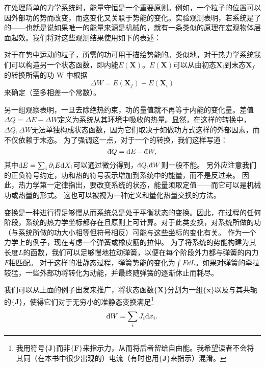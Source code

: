 	在处理简单的力学系统时，能量守恒是一个重要原则。例如，一个粒子的位置可以因外部功的势而改变，而这变化又关联于势能的变化。实验观测表明，若系统是了的——也就是说如果唯一的能量来源是机械的，就有一条类似的原理在宏观物体层面起效。我们将对这些观测结果使用如下的表述：



	对于在势中运动的粒子，所需的功可用于描绘势能的。类似地，对于热力学系统我们可以构造另一个状态函数，即内能\(E(\mathbf X)\)。\(E(\mathbf X)\)可以从由初态\(\mathbf X_i\)到末态\(\mathbf X_f\)的转换所需的功 W 中根据
	\begin{equation}
		\Delta W=E(\mathbf X_f)-E(\mathbf X_i)
	\end{equation}
	来确定（至多相差一个常数）。

	另一组观察表明，一旦去除绝热约束，功的量值就不再等于内能的变化量。差值\(\Delta Q=\Delta E−\Delta W\)定义为系统从其环境中吸收的热量。显然，在这样的转换中，\(\Delta Q, \Delta W\)无法单独构成状态函数，因为它们取决于如做功方式这样的外部因素，而不仅依赖于末态。
	为了强调这一点，对于一个的转换，我们这样写道：
	\begin{equation}
		\ddbar Q=\dd E-\ddbar W,
	\end{equation}
	其中\({\mathrm d} E=\sum_i\partial_iE{\mathrm d} X_i\)可以通过微分得到，\(\ddbar Q,\ddbar W\)则一般不能。
	另外应注意我们的正负符号约定，功和热的符号表示增加到系统中的能量，而不是反过来。
	因此，热力学第一定律指出，要改变系统的状态，能量须取定值——而它可以是机械功或热量的形式。
	这也可以被视为一种定义和量化热量交换的方法。

	变换是一种进行得足够慢从而系统总是处于平衡状态的变换。因此，在过程的任何阶段，系统的热力学坐标都存在且原则上可计算。对于此类变换，对系统所做的功（与系统所做的功大小相等但符号相反）可能与这些坐标的变化有关。
	作为一个力学上的例子，现在考虑一个弹簧或橡皮筋的拉伸。
	为了将系统的势能构建为其长度$L$的函数，我们可以足够慢地拉动弹簧，以便在每个阶段外力都与弹簧的内力$F$相匹配。
	对于这样的准静态过程，弹簧势能的变化为\(\int F\dd L\)。如果对弹簧的牵拉较猛，一些外部功将转化为动能，并最终随弹簧的逐渐休止而耗尽。

	我们可以从上面的例子出发来推广，将状态函数\(\{\mathbf X\}\)分割为一组\(\{\mathbf x\}\)以及与其共轭的\(\{\mathbf J\}\)，使得它们对于无穷小的准静态变换满足\footnote{我用符号\(\{\mathbf J\}\)而非\(\{\mathbf F\}\)来指示力，从而将后者留给自由能。我希望读者不会将其同（在本书中很少出现的）电流（有时也用\(\{\mathbf J\}\)来指示）混淆。}
	\begin{equation}
		\ddbar W=\sum_iJ_i\dd x_i.
	\end{equation}

